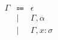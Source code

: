 \documentclass[12pt]{article}
\begin{document}
\pagestyle{empty}

\begin{align*}
    \begin{array}{rcl}
        \Gamma
        &\Coloneqq &\epsilon \\
        &\mid &\Gamma, \alpha \\
        &\mid &\Gamma, x: \sigma
    \end{array}
\end{align*}
\end{document}
